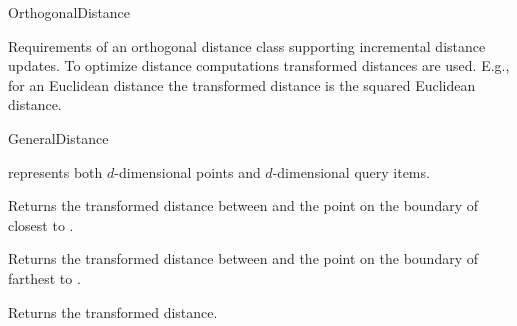 

\begin{ccRefConcept}{OrthogonalDistance}


\ccDefinition
  
Requirements of an orthogonal distance class supporting incremental distance updates.
To optimize distance computations transformed distances are used. 
E.g., for an Euclidean distance the transformed distance is the squared Euclidean distance.

\ccRefines

GeneralDistance

\ccParameters


 represents both $d$-dimensional points and
$d$-dimensional query items.


\ccTypes


\ccCreation
{}  %


\ccOperations


{Returns the transformed distance between  and
the point on the boundary of  closest to .}

{Returns the transformed distance between  and
the point on the boundary of  farthest to .}

 {Returns the transformed distance.}


\end{ccRefConcept}
